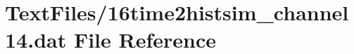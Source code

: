 \hypertarget{16time2histsim__channel14_8dat}{}\section{Text\+Files/16time2histsim\+\_\+channel14.dat File Reference}
\label{16time2histsim__channel14_8dat}
